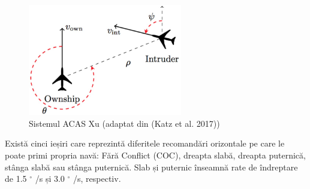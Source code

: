 \documentclass[12pt,a4paper]{article}
\theoremstyle{definition}
\theoremstyle{remark}
\begin{document}
\begin{figure}[h!]
  \centering
    \includegraphics[width=0.6\textwidth]{ACASXU.jpg}
    \caption{Sistemul ACAS Xu (adaptat din (Katz et al. 2017)) \cite{abstraction_art}}
\end{figure}
Există cinci ieșiri care reprezintă diferitele recomandări orizontale pe care le poate primi propria navă: Fără Conflict (COC), dreapta slabă, dreapta puternică, stânga slabă sau stânga puternică. Slab și puternic înseamnă rate de îndreptare de 1.5 $^{\circ}$ /s și 3.0 $^{\circ}$ /s, respectiv. \par
\end{document}
